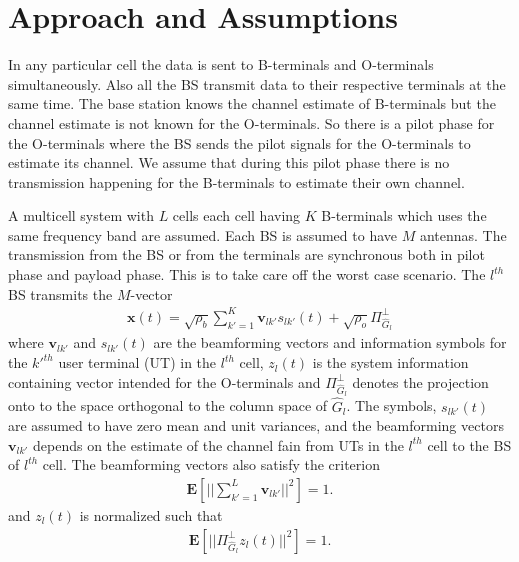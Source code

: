 \documentclass[10pt, a4paper, twoside,fleqn]{article}
\begin{document}
\section{Approach and Assumptions}	
	In any particular cell the data is sent to B-terminals and O-terminals simultaneously. Also all the BS transmit data to their respective terminals at the same time. The base station knows the channel estimate of B-terminals but the channel estimate is not known for the O-terminals. So there is a pilot phase for the O-terminals where the BS sends the pilot signals for the O-terminals to estimate its channel. We assume that during this pilot phase there is no transmission happening for the B-terminals to estimate their own channel.

	A multicell system with $L$ cells each cell having $K$ B-terminals which uses the same frequency band are assumed. Each BS is assumed to have $M$ antennas. The transmission from the BS or from the terminals are synchronous both in pilot phase and payload phase. This is to take care off the worst case scenario. The $l^{th}$ BS transmits the $M$-vector
\begin{eqnarray}
	\pmb{x}(t) = \sqrt{\rho_b}\sum\limits_{k'=1}^{K}\boldsymbol{v}_{lk'}s_{lk'}(t)
    		      + \sqrt{\rho_o}\Pi^{\perp}_{{\widehat{G}_l}}
\end{eqnarray}
where $\pmb{v}_{lk'}$ and $s_{lk'}(t)$ are the beamforming vectors and information symbols for the $k'^{th}$ user terminal (UT) in the $l^{th}$ cell, $z_l(t)$ is the system information containing vector intended for the O-terminals and $\Pi^{\perp}_{{\widehat{G}_l}}$ denotes the projection onto to the space orthogonal to the column space of $\hat G_l$. The symbols, $s_{lk'}(t)$ are assumed to have zero mean and unit variances, and the beamforming vectors $\pmb{v}_{lk'}$ depends on the estimate of the channel fain from UTs in the $l^{th}$ cell to the BS of $l^{th}$ cell. 
The beamforming vectors also satisfy the criterion
\begin{eqnarray}
	\pmb{E}\left[||\sum\limits_{k'=1}^{L}\pmb{v}_{lk'}||^2\right]=1.
\end{eqnarray}
and $z_l(t)$ is normalized such that
\begin{eqnarray}\label{eqn:zlcondition}
	\pmb{E}\left[||\Pi^{\perp}_{{\widehat{G}_l}}z_l(t)||^2\right]=1.
\end{eqnarray}
\end{document}
